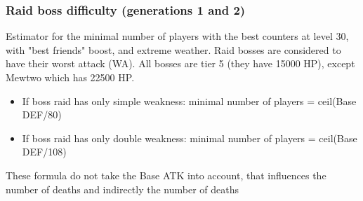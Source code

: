 \documentclass[12pt]{beamer}
\begin{document}
\begin{frame}
\begin{block}{}
\begin{footnotesize}
\begin{center}
\end{center}

\end{footnotesize}
\end{block}
\end{frame}

\begin{frame}
\begin{footnotesize}
\frametitle{Raid boss difficulty (generations 1 and 2)}

\begin{block}{}
Estimator for the minimal number of players with the best counters at level 30, with "best friends" boost, and extreme weather. Raid bosses are considered to have their worst attack (WA). All bosses are tier 5 (they have 15000 HP), except Mewtwo which has 22500 HP.
\begin{itemize}
  \item If boss raid has only simple weakness: minimal number of players = ceil(Base DEF/80)
  \item If boss raid has only double weakness: minimal number of players = ceil(Base DEF/108)
\end{itemize}
These formula do not take the Base ATK into account, that influences the number of deaths and indirectly the number of deaths 

\medskip


\end{block}
\end{footnotesize}
\end{frame}
\end{document}
